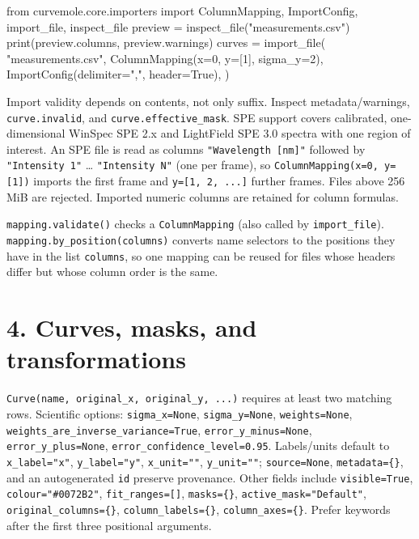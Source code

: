 \documentclass[
  10pt,
  a4paper,
  oneside]{scrreprt}
\newenvironment{Shaded}{}{}
\newcommand{\BuiltInTok}[1]{#1}
\newcommand{\DecValTok}[1]{\textcolor[rgb]{0.25,0.63,0.44}{#1}}
\newcommand{\ImportTok}[1]{#1}
\newcommand{\NormalTok}[1]{#1}
\newcommand{\OperatorTok}[1]{\textcolor[rgb]{0.40,0.40,0.40}{#1}}
\newcommand{\StringTok}[1]{\textcolor[rgb]{0.25,0.44,0.63}{#1}}
\newcommand{\VariableTok}[1]{\textcolor[rgb]{0.10,0.09,0.49}{#1}}
\begin{document}
\begin{Shaded}
\begin{Highlighting}[]
\ImportTok{from}\NormalTok{ curvemole.core.importers }\ImportTok{import}\NormalTok{ ColumnMapping, ImportConfig, import\_file, inspect\_file}
\NormalTok{preview }\OperatorTok{=}\NormalTok{ inspect\_file(}\StringTok{"measurements.csv"}\NormalTok{)}
\BuiltInTok{print}\NormalTok{(preview.columns, preview.warnings)}
\NormalTok{curves }\OperatorTok{=}\NormalTok{ import\_file(}
    \StringTok{"measurements.csv"}\NormalTok{, ColumnMapping(x}\OperatorTok{=}\DecValTok{0}\NormalTok{, y}\OperatorTok{=}\NormalTok{[}\DecValTok{1}\NormalTok{], sigma\_y}\OperatorTok{=}\DecValTok{2}\NormalTok{),}
\NormalTok{    ImportConfig(delimiter}\OperatorTok{=}\StringTok{","}\NormalTok{, header}\OperatorTok{=}\VariableTok{True}\NormalTok{),}
\NormalTok{)}
\end{Highlighting}
\end{Shaded}

Import validity depends on contents, not only suffix. Inspect
metadata/warnings, \texttt{curve.invalid}, and
\texttt{curve.effective\_mask}. SPE support covers calibrated,
one-dimensional WinSpec SPE 2.x and LightField SPE 3.0 spectra with one
region of interest. An SPE file is read as columns
\texttt{"Wavelength\ {[}nm{]}"} followed by \texttt{"Intensity\ 1"}
\ldots{} \texttt{"Intensity\ N"} (one per frame), so
\texttt{ColumnMapping(x=0,\ y={[}1{]})} imports the first frame and
\texttt{y={[}1,\ 2,\ ...{]}} further frames. Files above 256 MiB are
rejected. Imported numeric columns are retained for column formulas.

\texttt{mapping.validate()} checks a \texttt{ColumnMapping} (also called
by \texttt{import\_file}). \texttt{mapping.by\_position(columns)}
converts name selectors to the positions they have in the list
\texttt{columns}, so one mapping can be reused for files whose headers
differ but whose column order is the same.

\hypertarget{curves-masks-and-transformations-1}{%
\section{4. Curves, masks, and
transformations}\label{curves-masks-and-transformations-1}}

\texttt{Curve(name,\ original\_x,\ original\_y,\ ...)} requires at least
two matching rows. Scientific options: \texttt{sigma\_x=None},
\texttt{sigma\_y=None}, \texttt{weights=None},
\texttt{weights\_are\_inverse\_variance=True},
\texttt{error\_y\_minus=None}, \texttt{error\_y\_plus=None},
\texttt{error\_confidence\_level=0.95}. Labels/units default to
\texttt{x\_label="x"}, \texttt{y\_label="y"}, \texttt{x\_unit=""},
\texttt{y\_unit=""}; \texttt{source=None}, \texttt{metadata=\{\}}, and
an autogenerated \texttt{id} preserve provenance. Other fields include
\texttt{visible=True}, \texttt{colour="\#0072B2"},
\texttt{fit\_ranges={[}{]}}, \texttt{masks=\{\}},
\texttt{active\_mask="Default"}, \texttt{original\_columns=\{\}},
\texttt{column\_labels=\{\}}, \texttt{column\_axes=\{\}}. Prefer
keywords after the first three positional arguments.
\end{document}
